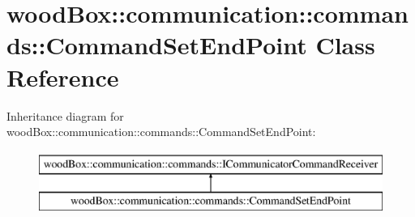 \hypertarget{classwood_box_1_1communication_1_1commands_1_1_command_set_end_point}{}\section{wood\+Box\+:\+:communication\+:\+:commands\+:\+:Command\+Set\+End\+Point Class Reference}
\label{classwood_box_1_1communication_1_1commands_1_1_command_set_end_point}
Inheritance diagram for wood\+Box\+:\+:communication\+:\+:commands\+:\+:Command\+Set\+End\+Point\+:\begin{figure}[H]
\begin{center}
\leavevmode
\includegraphics[height=2.000000cm]{classwood_box_1_1communication_1_1commands_1_1_command_set_end_point}
\end{center}
\end{figure}
